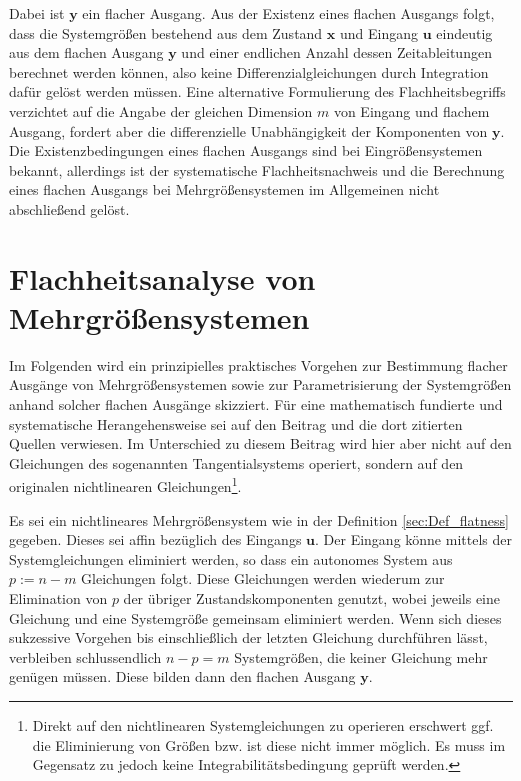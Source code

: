 Dabei ist $\mathbf{y}$ ein flacher Ausgang. Aus der Existenz eines flachen Ausgangs folgt, dass die Systemgrößen bestehend aus dem Zustand $\mathbf{x}$ und Eingang $\mathbf{u}$ eindeutig aus dem flachen Ausgang $\mathbf{y}$ und einer endlichen Anzahl dessen Zeitableitungen berechnet werden können, also keine Differenzialgleichungen durch Integration dafür gelöst werden müssen. Eine alternative Formulierung des Flachheitsbegriffs verzichtet auf die Angabe der gleichen Dimension $m$ von Eingang und flachem Ausgang, fordert aber die differenzielle Unabhängigkeit der Komponenten von $\mathbf{y}$. Die Existenzbedingungen eines ﬂachen Ausgangs sind bei Eingrößensystemen bekannt, allerdings ist der systematische Flachheitsnachweis und die Berechnung eines
ﬂachen Ausgangs bei Mehrgrößensystemen im Allgemeinen nicht abschließend gelöst. \cite[S. 185]{NLRT_Roebenack}

\section{Flachheitsanalyse von Mehrgrößensystemen}

Im Folgenden wird ein prinzipielles praktisches Vorgehen zur Bestimmung flacher Ausgänge von Mehrgrößensystemen sowie zur Parametrisierung der Systemgrößen anhand solcher flachen Ausgänge skizziert. Für eine mathematisch fundierte und systematische Herangehensweise sei auf den Beitrag \cite{Fritzsche2016} und die dort zitierten Quellen verwiesen. Im Unterschied zu diesem Beitrag wird hier aber nicht auf den  Gleichungen des sogenannten Tangentialsystems operiert, sondern auf den originalen nichtlinearen Gleichungen\footnote{Direkt auf den nichtlinearen Systemgleichungen zu operieren erschwert ggf. die Eliminierung von Größen bzw. ist diese nicht immer möglich. Es muss im Gegensatz zu \cite{Fritzsche2016} jedoch keine Integrabilitätsbedingung geprüft werden.}. 

Es sei ein nichtlineares Mehrgrößensystem wie in der Definition \ref{sec:Def_flatness} gegeben. Dieses sei affin bezüglich des Eingangs $\mathbf{u}$. Der Eingang könne mittels der Systemgleichungen eliminiert werden, so dass ein autonomes System aus $p := n - m$ Gleichungen folgt. Diese Gleichungen werden wiederum zur Elimination von $p$ der übriger Zustandskomponenten genutzt, wobei jeweils eine Gleichung und eine Systemgröße gemeinsam eliminiert werden. Wenn sich dieses sukzessive Vorgehen bis einschließlich der letzten Gleichung durchführen lässt, verbleiben schlussendlich $n - p = m$ Systemgrößen, die keiner Gleichung mehr genügen müssen. Diese bilden dann den flachen Ausgang $\mathbf{y}$.

